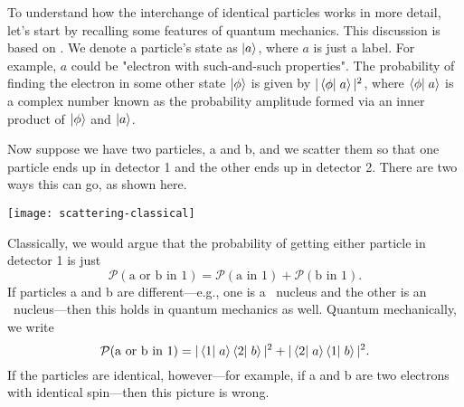 \begin{sidebar}
\label{sb.identical-particles}
To understand how the interchange of identical particles works in more detail, let's start by recalling some features of quantum mechanics. This discussion is based on  \citet{Feynman1989The-Feynman-Lec}.
We denote a particle's state as $\left|a\right\rangle$, where $a$ is just a label.  For example, $a$ could be "electron with such-and-such properties".  The probability of finding the electron in some other state $\left|\phi\right\rangle$ is given by $|\left\langle\phi\right|\left.a\right\rangle|^2$, where $\left\langle\phi\right|\left.a\right\rangle$ is a complex number known as the probability amplitude formed via an inner product of $\left|\phi\right\rangle$ and $\left|a\right\rangle$.

Now suppose we have two particles, a and b, and we scatter them so that one particle ends up in detector 1 and the other ends up in detector 2. There are two ways this can go, as shown here.
\begin{center}
\texttt{[image: scattering-classical]}
\end{center}
Classically, we would argue that the probability of getting either particle in detector 1 is just
\begin{equation}
    \mathcal{P}(\textrm{a or b in 1}) = \mathcal{P}(\textrm{a in 1}) + \mathcal{P}(\textrm{b in 1}).
\end{equation}
If particles a and b are different---e.g., one is a \carbon\ nucleus and the other is an \oxygen\ nucleus---then this holds in quantum mechanics as well. Quantum mechanically, we write
\begin{equation}
    \mathcal{P}(\textrm{a or b in 1}) = |\left\langle1\right|\left.a\right\rangle\left\langle2\right|\left.b\right\rangle|^2 + |\left\langle2\right|\left.a\right\rangle\left\langle1\right|\left.b\right\rangle|^2.
\end{equation}
If the particles are identical, however---for example, if a and b are two electrons with identical spin---then this picture is wrong.


\end{sidebar}
